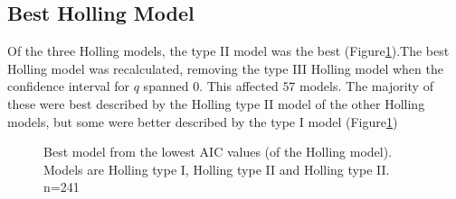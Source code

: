 \documentclass{article}
\begin{document}
\subsection{Best Holling Model}
Of the three Holling models, the type II model was the best (Figure\ref{fig:bestholandrecalmodel}).The best Holling model was recalculated, removing the type III Holling model when the confidence interval for $q$ spanned $0$. This affected $57$ models. The majority of these were best described by the Holling type II model of the other Holling models, but some were better described by the type I model (Figure\ref{fig:bestholandrecalmodel}) %
\begin{figure}[h!]
\centering
{}
\caption{Best model from the lowest AIC values (of the Holling model). Models are Holling type I, Holling type II and Holling type II. n=241}
\label{fig:bestholandrecalmodel}
\end{figure}
\end{document}
